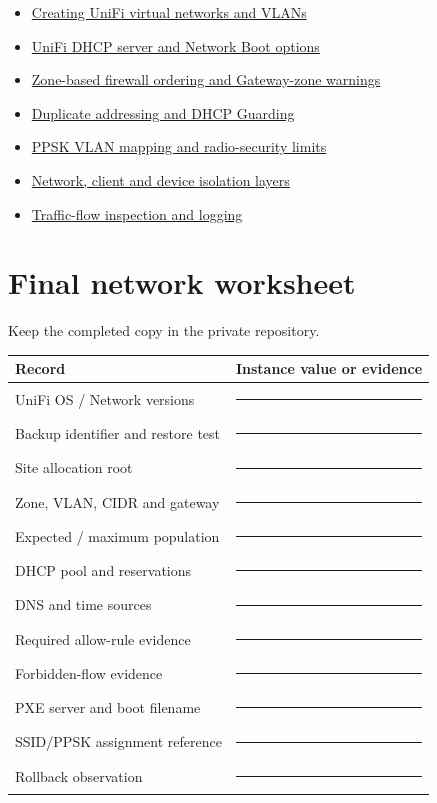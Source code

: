 \begin{itemize}
\item \href{https://help.ui.com/hc/en-us/articles/9761080275607-Creating-Virtual-Networks-VLANs}{Creating UniFi virtual networks and VLANs}
\item \href{https://help.ui.com/hc/en-us/articles/360012097513-UniFi-DHCP-Server}{UniFi DHCP server and Network Boot options}
\item \href{https://help.ui.com/hc/en-us/articles/115003173168-Zone-Based-Firewalls-in-UniFi}{Zone-based firewall ordering and Gateway-zone warnings}
\item \href{https://help.ui.com/hc/en-us/articles/19154105498007-Duplicate-IP-Addresses-and-Rogue-DHCP-Servers}{Duplicate addressing and DHCP Guarding}
\item \href{https://help.ui.com/hc/en-us/articles/29887064407319-Using-PPSK-RADIUS-for-Multiple-VLANs-On-an-SSID-in-UniFi-Network}{PPSK VLAN mapping and radio-security limits}
\item \href{https://help.ui.com/hc/en-us/articles/18965560820247-Implementing-Network-and-Client-Isolation-in-UniFi}{Network, client and device isolation layers}
\item \href{https://help.ui.com/hc/en-us/articles/32201256219799-Traffic-Flows-and-Traffic-Logging-in-UniFi-Network}{Traffic-flow inspection and logging}
\end{itemize}

\clearpage
\section{Final network worksheet}
Keep the completed copy in the private repository.

\begingroup
\renewcommand{\arraystretch}{1.65}
\begin{tabularx}{\linewidth}{@{}p{.28\linewidth}L@{}}
\toprule
\textbf{Record} & \textbf{Instance value or evidence}\\
\midrule
UniFi OS / Network versions & \rule{.65\linewidth}{.4pt}\\
Backup identifier and restore test & \rule{.65\linewidth}{.4pt}\\
Site allocation root & \rule{.65\linewidth}{.4pt}\\
Zone, VLAN, CIDR and gateway & \rule{.65\linewidth}{.4pt}\\
Expected / maximum population & \rule{.65\linewidth}{.4pt}\\
DHCP pool and reservations & \rule{.65\linewidth}{.4pt}\\
DNS and time sources & \rule{.65\linewidth}{.4pt}\\
Required allow-rule evidence & \rule{.65\linewidth}{.4pt}\\
Forbidden-flow evidence & \rule{.65\linewidth}{.4pt}\\
PXE server and boot filename & \rule{.65\linewidth}{.4pt}\\
SSID/PPSK assignment reference & \rule{.65\linewidth}{.4pt}\\
Rollback observation & \rule{.65\linewidth}{.4pt}\\
\bottomrule
\end{tabularx}
\endgroup


